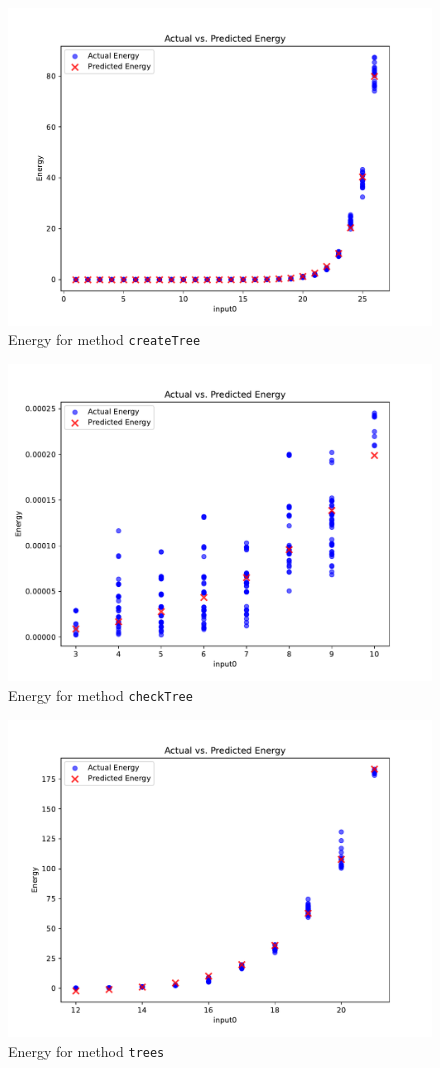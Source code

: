 \begin{figure}[htbp]
  \centering
  \includegraphics[width = .7 \textwidth]{figures/createTree_plot.pdf}
  \caption{Energy for method \texttt{createTree}}
  \label{fig:createTree_plot}
\end{figure}

\begin{figure}[htbp]
  \centering
  \includegraphics[width = .7 \textwidth]{figures/checkTree_plot.pdf}
  \caption{Energy for method \texttt{checkTree}}
  \label{fig:checkTree_plot}
\end{figure}

\begin{figure}[htbp]
  \centering
  \includegraphics[width = .7 \textwidth]{figures/trees_plot.pdf}
  \caption{Energy for method \texttt{trees}}
  \label{fig:trees_plot}
\end{figure}


